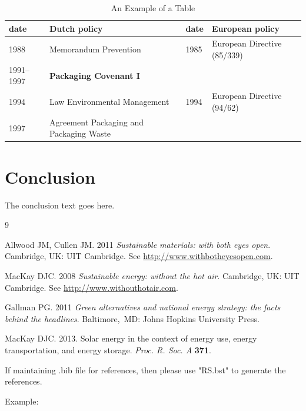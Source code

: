 \documentclass[openacc]{rsproca_new}%
\begin{document}
\begin{table}[!h]
\caption{An Example of a Table}%
\label{table_example}
\begin{tabular}{llll}%
\hline
date &Dutch policy &date &European policy \\
\hline
1988 &Memorandum Prevention &1985 &European Directive (85/339) \\
1991--1997 &{\bf Packaging Covenant I} & & \\
1994 &Law Environmental Management &1994 &European Directive (94/62) \\
1997 &Agreement Packaging and Packaging Waste & & \\\hline
\end{tabular}
\vspace*{-4pt}
\end{table}%

\section{Conclusion}
The conclusion text goes here.\vskip6pt

\enlargethispage{20pt}




\vskip2pc


\begin{thebibliography}{9}

 Allwood JM, Cullen JM. 2011 \textit{Sustainable materials:  with both eyes open}.
Cambridge, UK: UIT Cambridge. See \href{http://www.withbotheyesopen.com}{http://www.withbotheyesopen.com}.

  MacKay DJC. 2008  \textit{Sustainable energy:  without the hot air}.
 Cambridge, UK: UIT Cambridge. See \href{http://www.withouthotair.com}{http://www.withouthotair.com}.

 Gallman PG. 2011  \textit{Green alternatives and national energy strategy: the facts
 behind the headlines}.  Baltimore,\ MD: Johns Hopkins University Press.

 MacKay DJC. 2013.  Solar energy in the context of energy use, energy transportation, and
 energy storage. \textit{Proc. R. Soc. A} \textbf{371}.

\end{thebibliography}

\noindent If maintaining .bib file for references, then please use "RS.bst" to generate the references.

\noindent Example:

\verb++ %

\verb++ %
\end{document}
